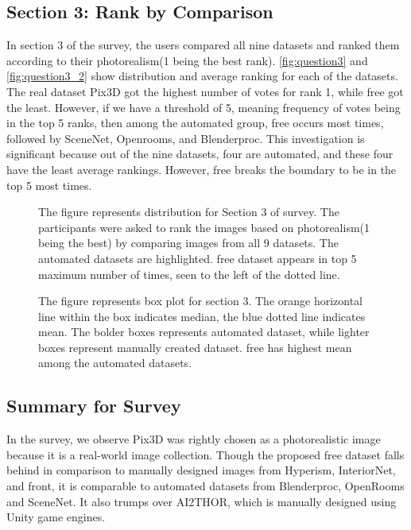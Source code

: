 \subsection{Section 3: Rank by Comparison}
In section 3 of the survey, the users compared all nine datasets and ranked them according to their photorealism(1 being the best rank).
\autoref{fig:question3} and \autoref{fig:question3_2} show distribution and average ranking for each of the datasets.
The real dataset Pix3D got the highest number of votes for rank 1, while \gls{free} got the least.
However, if we have a threshold of 5, meaning frequency of votes being in the top 5 ranks, then among the automated group, \gls{free} occurs most times, followed by SceneNet, Openrooms, and Blenderproc.
This investigation is significant because out of the nine datasets, four are automated, and these four have the least average rankings.
However, \gls{free} breaks the boundary to be in the top 5 most times.

\begin{figure}
    \centering
    \resizebox{\textwidth}{!}{}
    \caption[Distibution for Survey:Section 3]{The figure represents distribution for Section 3 of survey. The participants were asked to rank the images based on photorealism(1 being the best) by comparing images from all 9 datasets.
    The automated datasets are highlighted. \gls{free} dataset appears in top 5 maximum number of times, seen to the left of the dotted line.}
    \label{fig:question3}
\end{figure}

\begin{figure}
    \centering
    \resizebox{0.75\textwidth}{!}{}
    \caption[Average Rankings for Survey:Section 3]{The figure represents box plot for section 3. The orange horizontal line within the box indicates median, the blue dotted line indicates mean.
    The bolder boxes represents automated dataset, while lighter boxes represent manually created dataset. \Gls{free} has highest mean among the automated datasets.}
    \label{fig:question3_2}
\end{figure}

\subsection{Summary for Survey}
In the survey, we observe Pix3D was rightly chosen as a photorealistic image because it is a real-world image collection.
Though the proposed \gls{free} dataset falls behind in comparison to manually designed images from Hyperism, InteriorNet, and \gls{front},
it is comparable to automated datasets from Blenderproc, OpenRooms and SceneNet.
It also trumps over AI2THOR, which is manually designed using Unity game engines.

